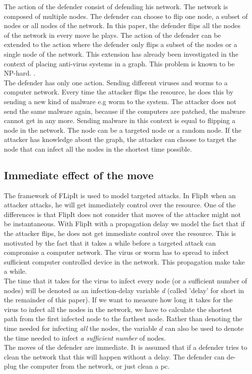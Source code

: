 The action of the defender consist of defending his network. The network is composed of multiple nodes. The defender can choose to flip one node, a subset of nodes or all nodes of the network. In this paper, the defender flips all the nodes of the network in every move he plays. The action of the defender can be extended to the action where the defender only flips a subset of the nodes or a single node of the network. This extension has already been investigated in the context of placing anti-virus systems in a graph. This problem is known to be NP-hard. \cite{NPhard}. \\
The defender has only one action. Sending different viruses and worms to a computer network. Every time the attacker flips the resource, he does this by sending a new kind of malware e.g worm to the system. The attacker does not send the same malware again, because if the computers are patched, the malware cannot get in any more. Sending malware in this context is equal to flipping a node in the network. The node can be a targeted node or a random node. If the attacker has knowledge about the graph, the attacker can choose to target the node that can infect all the nodes in the shortest time possible.
\subsection{Immediate effect of the move}
The framework of FLipIt is used to model targeted attacks. In FlipIt when an attacker attacks, he will get immediately control over the resource. One of the differences is that FlipIt does not consider that moves of the attacker might not be instantaneous. With FlipIt with a propagation delay we model the fact that if the attacker flips, he does not get immediate control over the resource.  This is motivated by the fact that it takes a while before a targeted attack can compromise a computer network. The virus or worm has to spread to infect sufficient computer controlled device in the network. This propagation make take a while. \\
The time that it takes for the virus to infect every node (or a sufficient number of nodes) will be
denoted as an infection-delay variable \textit{d} (called 'delay' for short in the remainder of this paper). If we want to measure how long it takes for the virus to
infect all the nodes in the network, we have to calculate the shortest path from the
first infected node to the farthest node. Rather than denoting the time needed for infecting \textit{all} the nodes, the variable $d$ can also be used to denote the time needed to infect \textit{a sufficient number} of nodes. \\
The moves of the defender are immediate. It is assumed that if a defender tries to clean the network that this will happen without a delay. The defender can de-plug the computer from the network, or just clean a pc. 
